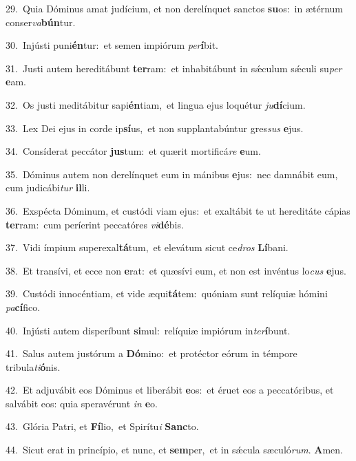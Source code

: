 {\numbfont\textcolor{\numbcolor}{29.}}~Quia Dóminus amat judícium, et non derelínquet sanctos \textbf{su}\-os:~\star in ætérnum conser\-\textit{va}\-\textbf{bún}tur.\par
{\numbfont\textcolor{\numbcolor}{30.}}~Injústi puni\-\textbf{én}\-tur:~\star et semen impiórum \textit{per}\-\textbf{í}bit.\par
{\numbfont\textcolor{\numbcolor}{31.}}~Justi autem hereditábunt \textbf{ter}\-ram:~\star et inhabitábunt in sǽculum sǽculi su\textit{per} \textbf{e}\-am.\par
{\numbfont\textcolor{\numbcolor}{32.}}~Os justi meditábitur sapi\-\textbf{én}\-tiam,~\star et lingua ejus loquétur \textit{ju}\-\textbf{dí}cium.\par
{\numbfont\textcolor{\numbcolor}{33.}}~Lex Dei ejus in corde ip\-\textbf{sí}\-us,~\star et non supplantabúntur gres\textit{sus} \textbf{e}\-jus.\par
{\numbfont\textcolor{\numbcolor}{34.}}~Consíderat peccátor \textbf{jus}\-tum:~\star et quærit mortificá\textit{re} \textbf{e}\-um.\par
{\numbfont\textcolor{\numbcolor}{35.}}~Dóminus autem non derelínquet eum in mánibus \textbf{e}\-jus:~\star nec damnábit eum, cum judicábi\textit{tur} \textbf{il}\-li.\par
{\numbfont\textcolor{\numbcolor}{36.}}~Exspécta Dóminum, et custódi viam ejus:~\dagger et exaltábit te ut hereditáte cápias \textbf{ter}\-ram:~\star cum períerint peccatóres \textit{vi}\-\textbf{dé}bis.\par
{\numbfont\textcolor{\numbcolor}{37.}}~Vidi ímpium superexal\-\textbf{tá}\-tum,~\star et elevátum sicut ce\textit{dros} \textbf{Lí}\-bani.\par
{\numbfont\textcolor{\numbcolor}{38.}}~Et transívi, et ecce non \textbf{e}\-rat:~\star et quæsívi eum, et non est invéntus lo\textit{cus} \textbf{e}\-jus.\par
{\numbfont\textcolor{\numbcolor}{39.}}~Custódi innocéntiam, et vide æqui\-\textbf{tá}\-tem:~\star quóniam sunt relíquiæ hómini \textit{pa}\-\textbf{cí}fico.\par
{\numbfont\textcolor{\numbcolor}{40.}}~Injústi autem disperíbunt \textbf{si}\-mul:~\star relíquiæ impiórum in\-\textit{ter}\-\textbf{í}bunt.\par
{\numbfont\textcolor{\numbcolor}{41.}}~Salus autem justórum a \textbf{Dó}\-mino:~\star et protéctor eórum in témpore tribula\-\textit{ti}\-\textbf{ó}nis.\par
{\numbfont\textcolor{\numbcolor}{42.}}~Et adjuvábit eos Dóminus et liberábit \textbf{e}\-os:~\star et éruet eos a peccatóribus, et salvábit eos: quia speravérunt \textit{in} \textbf{e}\-o.\par
{\numbfont\textcolor{\numbcolor}{43.}}~Glória Patri, et \textbf{Fí}\-lio,~\star et Spirítu\textit{i} \textbf{Sanc}\-to.\par
{\numbfont\textcolor{\numbcolor}{44.}}~Sicut erat in princípio, et nunc, et \textbf{sem}\-per,~\star et in sǽcula sæculó\-\textit{rum}\-. \textbf{A}\-men.\par
